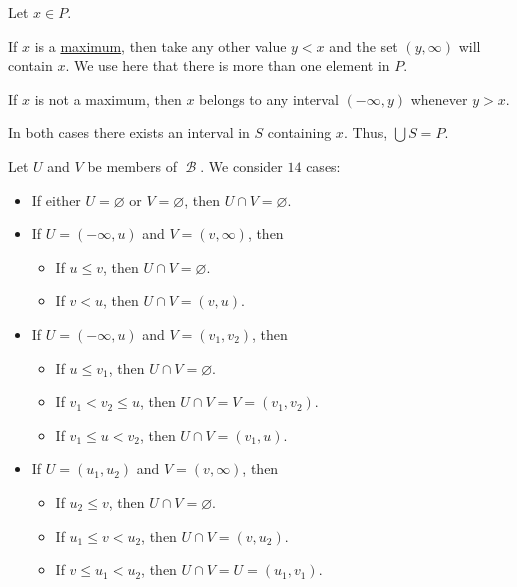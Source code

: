 \begin{defproof}
   Let \( x \in P \).

  If \( x \) is a \hyperref[def:partially_ordered_set_extremal_points/maximum_and_minimum]{maximum}, then take any other value \( y < x \) and the set \( (y, \infty) \) will contain \( x \). We use here that there is more than one element in \( P \).

  If \( x \) is not a maximum, then \( x \) belongs to any interval \( (-\infty, y) \) whenever \( y > x \).

  In both cases there exists an interval in \( S \) containing \( x \). Thus, \( \bigcup S = P \).

   Let \( U \) and \( V \) be members of \( \mscrB \). We consider \( 14 \) cases:
  \begin{itemize}
    \item If either \( U = \varnothing \) or \( V = \varnothing \), then \( U \cap V = \varnothing \).
    \item If \( U = (-\infty, u) \) and \( V = (v, \infty) \), then
    \begin{itemize}
      \item If \( u \leq v \), then \( U \cap V = \varnothing \).
      \item If \( v < u \), then \( U \cap V = (v, u) \).
    \end{itemize}

    \item If \( U = (-\infty, u) \) and \( V = (v_1, v_2) \), then
    \begin{itemize}
      \item If \( u \leq v_1 \), then \( U \cap V = \varnothing \).
      \item If \( v_1 < v_2 \leq u \), then \( U \cap V = V =  (v_1, v_2) \).
      \item If \( v_1 \leq u < v_2 \), then \( U \cap V = (v_1, u) \).
    \end{itemize}

    \item If \( U = (u_1, u_2) \) and \( V = (v, \infty) \), then
    \begin{itemize}
      \item If \( u_2 \leq v \), then \( U \cap V = \varnothing \).
      \item If \( u_1 \leq v < u_2 \), then \( U \cap V = (v, u_2) \).
      \item If \( v \leq u_1 < u_2 \), then \( U \cap V = U = (u_1, v_1) \).
    \end{itemize}


\end{itemize}
\end{defproof}

